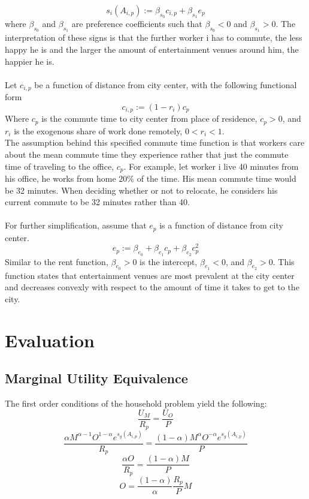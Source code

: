 \documentclass{article}
\begin{document}
\begin{equation}
s_i(A_{i,p}) := \beta_{s_0} c_{i,p} + \beta_{s_1} e_{p}
\end{equation}
where $\beta_{s_0}$ and $\beta_{s_1}$ are preference coefficients such that $\beta_{s_0} < 0$ and $\beta_{s_1} > 0$. The interpretation of these signs is that the further worker i has to commute, the less happy he is and the larger the amount of entertainment venues around him, the happier he is.\\ \\
Let $c_{i,p}$ be a function of distance from city center, with the following functional form
\begin{equation}
c_{i,p} := (1-r_i) c_p
\end{equation}
Where $c_p$ is the commute time to city center from place of residence, $c_p > 0$, and $r_i$ is the exogenous share of work done remotely, $0 < r_i < 1$.\\
The assumption behind this specified commute time function is that workers care about the mean commute time they experience rather that just the commute time of traveling to the office, $c_p$. For example, let worker i live 40 minutes from his office, he works from home $20\%$ of the time. His mean commute time would be 32 minutes. When deciding whether or not to relocate, he considers his current commute to be 32 minutes rather than 40.\\ \\
For further simplification, assume that $e_{p}$ is a function of distance from city center.\\
\begin{equation}
e_{p} := \beta_{e_0} + \beta_{e_1} c_p + \beta_{e_2} c_p^2
\end{equation}
Similar to the rent function, $\beta_{e_0} > 0$ is the intercept, $\beta_{e_1} < 0$, and $\beta_{e_2} > 0$. This function states that entertainment venues are most prevalent at the city center and decreases convexly with respect to the amount of time it takes to get to the city.

\section{Evaluation}
\subsection{Marginal Utility Equivalence}
The first order conditions of the household problem yield the following:
$$\frac{U_M}{R_{p}} = \frac{U_O}{P}$$
$$\frac{\alpha M^{\alpha - 1} O^{1-\alpha}e^{s_g(A_{i,p})}}{R_{p}} = \frac{ (1-\alpha)M^{\alpha}O^{-\alpha}e^{s_g(A_{i,p})}}{P}$$
$$\frac{\alpha O}{R_{p}} = \frac{(1-\alpha)M}{P}$$
$$O = \frac{(1 - \alpha)}{\alpha}\frac{R_{p}}{P}M$$
\end{document}
